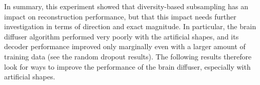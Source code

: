 

In summary, this experiment showed that diversity-based subsampling has an impact on reconstruction performance, but that this impact needs further investigation in terms of direction and exact magnitude. In particular, the brain diffuser algorithm performed very poorly with the artificial shapes, and its decoder performance improved only marginally even with a larger amount of training data (see the random dropout results). The following results therefore look for ways to improve the performance of the brain diffuser, especially with artificial shapes.

